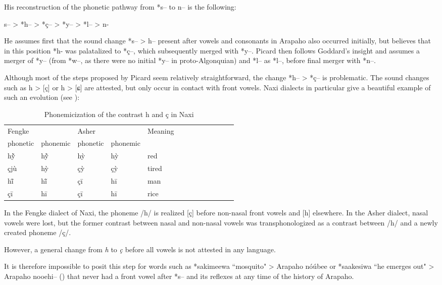 \documentclass[oldfontcommands,oneside,a4paper,11pt]{article}
\newcommand{\ipa}[1]{{\phon #1}} %
\begin{document}
 His reconstruction of the phonetic pathway from *s-- to n-- is the following:
 \begin{exe}
\ex
\glt *s-- > *h-- > *ç-- > *y-- > *l-- > n-
\end{exe}

He assumes first that the sound change *s-- > h-- present after vowels and consonants in Arapaho also occurred initially, but   believes that in this position *h- was palatalized to *ç--, which subsequently merged with *y--.   Picard then follows Goddard's insight and assumes a merger of *y-- (from *w--, as there were no initial *y-- in proto-Algonquian) and *l-- as *l--, before final merger with *n--.

Although most of the steps proposed by Picard seem relatively straightforward, the change *h-- > *ç-- is problematic. The sound changes such as h > [ç] or h > [ɕ] are  attested, but only occur in contact with front vowels. Naxi dialects in particular give a beautiful example of such an evolution (see \citealt[27-33]{michaud06neutralisation}):

\begin{table}[H]
\caption{Phonemicization of the contrast h and ç in  Naxi } \centering
\begin{tabular}{lllllllllllll}
\toprule
Fengke  & 	  & 	Asher  & 	  & 	Meaning  \\ 
phonetic & phonemic & phonetic & phonemic &  \\
\midrule
hỹ̀& hỹ̀  & hỳ & hỳ  & 	red  \\ 
çjù & hỳ  & çỳ & çỳ  & 	tired  \\ 
hĩ̄ & 	hĩ̄  &  çī & hī  & 	man  \\ 
çī & 	hī  & çī & 	hī  & 	rice  \\ 
\bottomrule
\end{tabular}
\end{table}
In the Fengke dialect of Naxi, the phoneme /h/ is realized [ç] before non-nasal front vowels and [h] elsewhere. In the Asher dialect, nasal vowels were lost, but the former  contrast between nasal and non-nasal vowels was transphonologized as a contrast between /h/ and a newly created phoneme /ç/.

However, a general change from \textit{h} to \textit{ç} before all vowels is not attested in any language.

It is therefore impossible to posit this step for words such as  *sakimeewa ``mosquito" > Arapaho \ipa{nóúbee} or *saakesiwa ``he emerges out" > Arapaho \ipa{nooehi--} (\citealt[314]{pentland98}) that never had a front vowel after *s-- and its reflexes at any time of the history of Arapaho.
\end{document}
